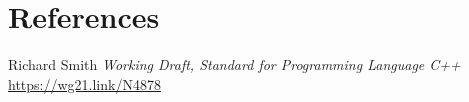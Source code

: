 \documentclass{wg21}
\begin{document}
\section{References}
\renewcommand{\section}[2]{}%



\begin{thebibliography}{9}

Richard Smith
\emph{Working Draft, Standard for Programming Language C++}\newline
\url{https://wg21.link/N4878}

\end{thebibliography}
\end{document}
